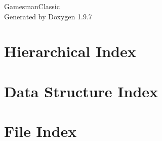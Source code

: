 \documentclass[twoside]{book}
\newcommand{\+}{\discretionary{\mbox{\scriptsize$\hookleftarrow$}}{}{}}
\newcommand{\clearemptydoublepage}{%
    \newpage{\pagestyle{empty}\cleardoublepage}%
  }
\begin{document}
  \raggedbottom
    \hypersetup{pageanchor=false,
                bookmarksnumbered=true,
                pdfencoding=unicode
               }
  \begin{titlepage}
  \vspace*{7cm}
  \begin{center}%
  {\Large Gamesman\+Classic}\\
  \vspace*{1cm}
  {\large Generated by Doxygen 1.9.7}\\
  \end{center}
  \end{titlepage}
  \clearemptydoublepage
  \tableofcontents
  \clearemptydoublepage
  \hypersetup{pageanchor=true}
\chapter{Hierarchical Index}

\chapter{Data Structure Index}

\chapter{File Index}

\end{document}
